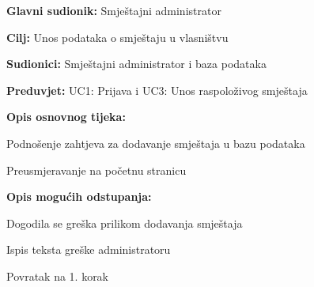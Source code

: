 					\noindent {}
					\begin{packed_item}
						
						\item \textbf{Glavni sudionik: }Smještajni administrator
						\item  \textbf{Cilj:} Unos podataka o smještaju u vlasništvu
						\item  \textbf{Sudionici:} Smještajni administrator i baza podataka
						\item  \textbf{Preduvjet:} UC1: Prijava i UC3: Unos raspoloživog smještaja
						\item  \textbf{Opis osnovnog tijeka:}
						
						\item[] \begin{packed_enum}
							
							\item Podnošenje zahtjeva za dodavanje smještaja u bazu podataka
							\item Preusmjeravanje na početnu stranicu
							
						\end{packed_enum}
						
						\item  \textbf{Opis mogućih odstupanja:}
						
						\item[] \begin{packed_item}
							
							\item[1.a] Dogodila se greška prilikom dodavanja smještaja
							\item[] \begin{packed_enum}
								
								\item Ispis teksta greške administratoru
								\item Povratak na 1. korak
								
							\end{packed_enum}
							
						\end{packed_item}
					\end{packed_item}
					
